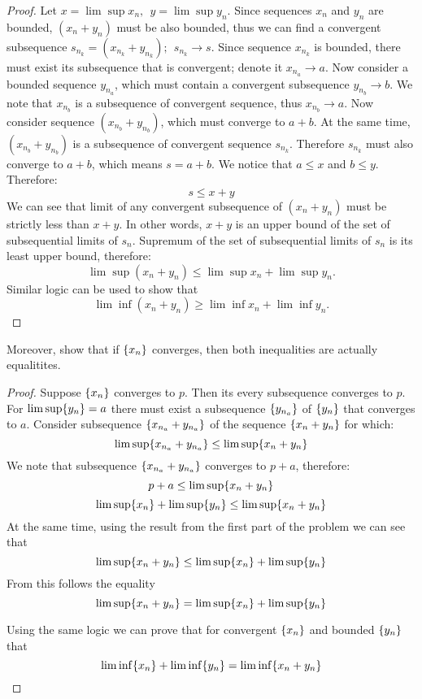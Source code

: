 \documentclass{article}
\DeclarePairedDelimiter{\set}{ \{ }{ \} }
\begin{document}
\begin{proof}

Let $x = \lim \sup x_n, \>\> y = \lim \sup y_n$.
Since sequences $x_n$ and $y_n$ are bounded, $(x_n+y_n)$ must be also bounded, thus we can find a convergent subsequence
$s_{n_k} = (x_{n_k} + y_{n_k}); \>\> s_{n_k} \to s$.
Since sequence $x_{n_k}$ is bounded, there must exist its subsequence that is convergent; denote it $x_{n_a} \to a$.
Now consider a bounded sequence $y_{n_a}$, which must contain a convergent subsequence $y_{n_b} \to b$.
We note that $x_{n_b}$ is a subsequence of convergent sequence, thus $x_{n_b} \to a$.
Now consider sequence $(x_{n_b}+y_{n_b})$, which must converge to $a+b$.
At the same time, $(x_{n_b}+y_{n_b})$ is a subsequence of convergent sequence $s_{n_k}$.
Therefore $s_{n_k}$ must also converge to $a+b$, which means $s=a+b$.
We notice that $a \leq x$ and $b \leq y$.
Therefore:
\[ s \leq x + y \]
We can see that limit of any convergent subsequence of $(x_n+y_n)$ must be strictly less than $x+y$.
In other words, $x+y$ is an upper bound of the set of subsequential limits of $s_n$.
Supremum of the set of subsequential limits of $s_n$ is its least upper bound, therefore:
\[ \lim \sup (x_n + y_n) \leq \lim \sup x_n + \lim \sup y_n. \]
Similar logic can be used to show that
\[ \lim \inf (x_n + y_n) \geq \lim \inf x_n + \lim \inf y_n. \]

\end{proof}

\begin{tcolorbox}
Moreover, show that if $\set{x_n}$ converges, then both inequalities are actually equalitites.
\end{tcolorbox}

\begin{proof}

Suppose $\set{x_n}$ converges to $p$.
Then its every subsequence converges to $p$.
For $\lim \sup \set{y_n} = a$ there must exist a subsequence $\set{y_{n_a}}$ of $\set{y_n}$ that converges to $a$.
Consider subsequence $\set{ x_{n_a} + y_{n_a} }$ of the sequence $\set{ x_n + y_n }$ for which:
\[ \lim \sup \set{ x_{n_a} + y_{n_a} } \leq \lim \sup \set{ x_n + y_n } \]
We note that  subsequence $\set{ x_{n_a} + y_{n_a} }$ converges to $p+a$, therefore:
\[ p + a \leq \lim \sup \set{ x_n + y_n } \]
\[ \lim \sup \set{ x_n } + \lim \sup \set{y_n} \leq \lim \sup \set{ x_n + y_n } \]
At the same time, using the result from the first part of the problem we can see that
\[ \lim \sup \set{ x_n + y_n } \leq \lim \sup \set{ x_n } + \lim \sup \set{y_n} \]
From this follows the equality
\[ \lim \sup \set{ x_n + y_n } = \lim \sup \set{ x_n } + \lim \sup \set{y_n} \]

Using the same logic we can prove that for convergent $\set{ x_n }$ and bounded $\set{ y_n }$ that
\[ \lim \inf \set{ x_n } + \lim \inf \set{ y_n } = \lim \inf \set{ x_n + y_n} \]

\end{proof}
\end{document}
